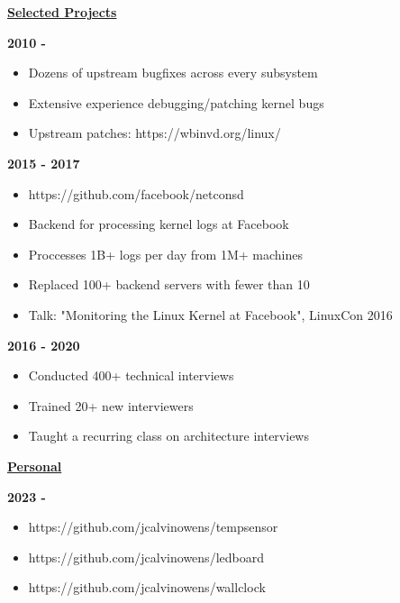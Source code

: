 \documentclass[11pt]{article}
\begin{document}
\begin{multicols}{2}

\centerline{\underline{\bf Selected Projects}}

\bigskip

 \hfill {\bf 2010 -}
\begin{itemize}[leftmargin=2em]
\itemsep 0em
	\item Dozens of upstream bugfixes across every subsystem
	\item Extensive experience debugging/patching kernel bugs
	\item Upstream patches: https://wbinvd.org/linux/
\end{itemize}

 \hfill {\bf 2015 - 2017}
\begin{itemize}[leftmargin=2em]
\itemsep 0em
	\item https://github.com/facebook/netconsd
	\item Backend for processing kernel logs at Facebook
	\item Proccesses 1B+ logs per day from 1M+ machines
	\item Replaced 100+ backend servers with fewer than 10
	\item Talk: "Monitoring the Linux Kernel at Facebook", LinuxCon 2016
\end{itemize}

 \hfill {\bf 2016 - 2020}
\begin{itemize}[leftmargin=2em]
\itemsep 0em
	\item Conducted 400+ technical interviews
	\item Trained 20+ new interviewers
	\item Taught a recurring class on architecture interviews
\end{itemize}

\vfill\null
\columnbreak

\centerline{\underline{\bf Personal}}

\bigskip

 \hfill {\bf 2023 -}
\begin{itemize}[leftmargin=2em]
\itemsep 0em
	\item https://github.com/jcalvinowens/tempsensor
	\item https://github.com/jcalvinowens/ledboard
	\item https://github.com/jcalvinowens/wallclock
\end{itemize}


\end{multicols}
\end{document}

